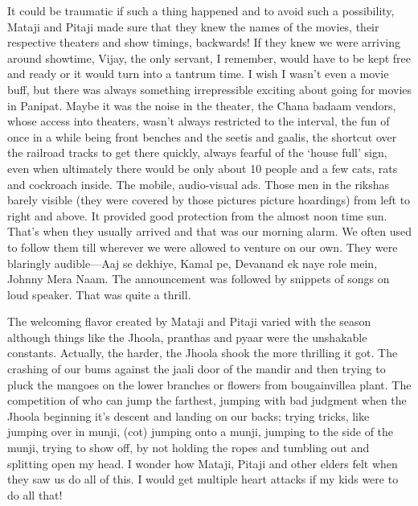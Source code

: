 It could be traumatic if such a thing happened and to avoid such a possibility, Mataji and Pitaji made sure that they knew the names of the movies, their respective theaters and show timings, backwards! If they knew we were arriving around showtime, Vijay, the only servant, I remember, would have to be kept free and ready or it would turn into a tantrum time. I wish I wasn’t even a movie buff, but there was always something irrepressible exciting about going for movies in Panipat. Maybe it was the noise in the theater, the Chana badaam vendors, whose access into theaters, wasn’t always restricted to the interval, the fun of once in a while being front benches and the seetis and gaalis, the shortcut over the railroad tracks to get there quickly, always fearful of the ‘house full’ sign, even when ultimately there would be only about 10 people and a few cats, rats and cockroach inside. The mobile, audio-visual ads. Those men in the rikshas barely visible (they were covered by those pictures picture hoardings) from left to right and above. It provided good protection from the almost noon time sun. That’s when they usually arrived and that was our morning alarm. We often used to follow them till wherever we were allowed to venture on our own. They were blaringly audible—Aaj se dekhiye, Kamal pe, Devanand ek naye role mein, Johnny Mera Naam. The announcement was followed by snippets of songs on loud speaker. That was quite a thrill.

The welcoming flavor created by Mataji and Pitaji varied with the season although things like the Jhoola, pranthas and pyaar were the unshakable constants. Actually, the harder, the Jhoola shook the more thrilling it got. The crashing of our bums against the jaali door of the mandir and then trying to pluck the mangoes on the lower branches or flowers from bougainvillea plant. The competition of who can jump the farthest, jumping with bad judgment when the Jhoola beginning it’s descent and landing on our backs; trying tricks, like jumping over in munji, (cot) jumping onto a munji, jumping to the side of the munji, trying to show off, by not holding the ropes and tumbling out and splitting open my head. I wonder how Mataji, Pitaji and other elders felt when they saw us do all of this. I would get multiple heart attacks if my kids were to do all that!

